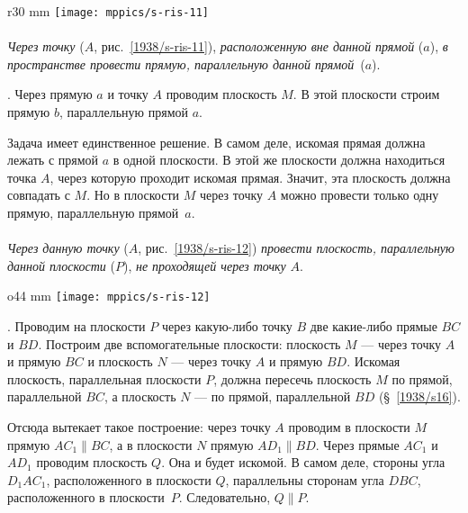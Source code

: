 \begin{wrapfigure}{r}{30 mm}
\centering
\vskip-0mm
\texttt{[image: mppics/s-ris-11]}
\caption{}\label{1938/s-ris-11}
\end{wrapfigure}

\paragraph{}\label{1938/s19}
\emph{Через точку} ($A$, рис.~\ref{1938/s-ris-11}), \emph{расположенную вне данной прямой} ($a$), \emph{в пространстве провести прямую, параллельную данной прямой}~($a$).


\medskip

\mbox{.}
Через прямую $a$ и точку $A$ проводим плоскость $M$.
В этой плоскости строим прямую $b$, параллельную прямой $a$.

Задача имеет единственное решение.
В самом деле, искомая прямая должна лежать с прямой $a$ в одной плоскости.
В этой же плоскости должна находиться точка $A$, через которую проходит искомая прямая.
Значит, эта плоскость должна совпадать с $M$.
Но в плоскости $M$ через точку $A$ можно провести только одну прямую, параллельную прямой~$a$.

\paragraph{}\label{1938/s20}
\emph{Через данную точку} ($A$, рис.~\ref{1938/s-ris-12}) \emph{провести плоскость, параллельную данной плоскости} ($P$), \emph{не проходящей через точку} $A$.

\begin{wrapfigure}{o}{44 mm}
\centering
\texttt{[image: mppics/s-ris-12]}
\caption{}\label{1938/s-ris-12}
\end{wrapfigure}

\mbox{.}
Проводим на плоскости $P$ через какую-либо точку $B$ две какие-либо прямые $BC$ и $BD$.
Построим две вспомогательные плоскости: плоскость $M$ — через точку $A$ и прямую $BC$ и плоскость $N$ — через точку $A$ и прямую $BD$.
Искомая плоскость, параллельная плоскости $P$, должна пересечь плоскость $M$ по прямой, параллельной $BC$, а плоскость $N$ — по прямой, параллельной $BD$ (§~\ref{1938/s16}).

Отсюда вытекает такое построение: через точку $A$ проводим в плоскости $M$ прямую $AC_1\parallel BC$, а в плоскости $N$ прямую $AD_1\parallel BD$.
Через прямые $AC_1$ и $AD_1$ проводим плоскость $Q$.
Она и будет искомой.
В самом деле, стороны угла $D_1AC_1$, расположенного в плоскости $Q$, параллельны сторонам угла $DBC$, расположенного в плоскости~$P$.
Следовательно, $Q\parallel P$.


